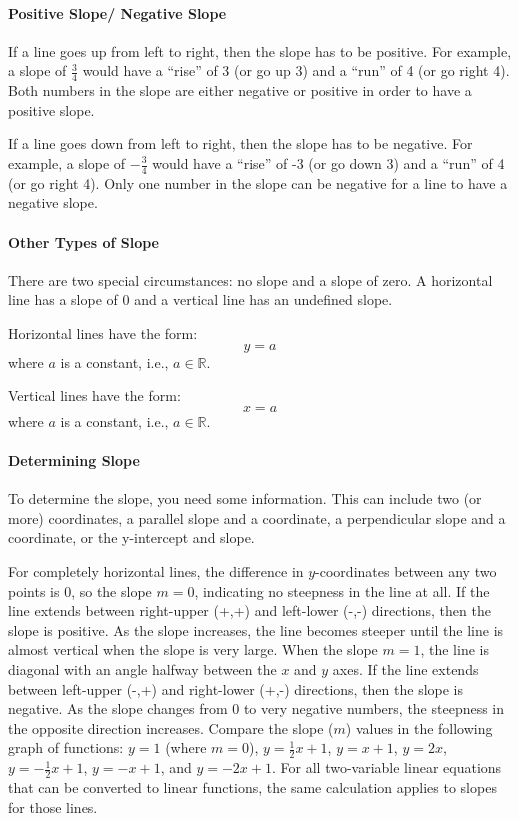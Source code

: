 \paragraph{Positive Slope/ Negative Slope}

If a line goes up from left to right, then the slope has to be positive. For example, a slope of $\frac{3}{4}$ would have a “rise” of 3 (or go up 3) and a “run” of 4 (or go right 4). Both numbers in the slope are either negative or positive in order to have a positive slope.

If a line goes down from left to right, then the slope has to be negative. For example, a slope of $-\frac{3}{4}$ would have a “rise” of -3 (or go down 3) and a “run” of 4 (or go right 4). Only one number in the slope can be negative for a line to have a negative slope.

\paragraph{Other Types of Slope}

There are two special circumstances: no slope and a slope of zero. A horizontal line has a slope of 0 and a vertical line has an undefined slope.

Horizontal lines have the form:
$$
y = a
$$
where $a$ is a constant, i.e., $a \in \mathbb{R}$.

Vertical lines have the form:
$$
x = a
$$
where $a$ is a constant, i.e., $a \in \mathbb{R}$.

\paragraph{Determining Slope}

To determine the slope, you need some information. This can include two (or more) coordinates, a parallel slope and a coordinate, a perpendicular slope and a coordinate, or the y-intercept and slope.

For completely horizontal lines, the difference in $y$-coordinates between any two points is 0, so the slope $m = 0$, indicating no steepness in the line at all. If the line extends between right-upper (+,+) and left-lower (-,-) directions, then the slope is positive. As the slope increases, the line becomes steeper until the line is almost vertical when the slope is very large. When the slope $m = 1$, the line is diagonal with an angle halfway between the $x$ and $y$ axes. If the line extends between left-upper (-,+) and right-lower (+,-) directions, then the slope is negative. As the slope changes from 0 to very negative numbers, the steepness in the opposite direction increases. Compare the slope ($m$) values in the following graph of functions: $y = 1$ (where $m = 0$), $y = \frac{1}{2}x + 1$, $y = x + 1$, $y = 2x$, $y = -\frac{1}{2}x + 1$, $y = -x + 1$, and $y = -2x + 1$. For all two-variable linear equations that can be converted to linear functions, the same calculation applies to slopes for those lines.

